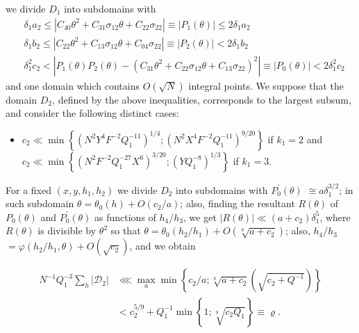 \documentclass[10pt]{article}
\begin{document}
\begin{itemize}
$$$$
we divide $D_{1}$ into subdomains with
$$
\begin{aligned}
& \delta_{1} a_{2} \leqslant\left|C_{40} \theta^{2}+C_{31} \sigma_{12} \theta+C_{22} \sigma_{22}\right| \equiv\left|P_{1}(\theta)\right| \leqslant 2 \delta_{1} a_{2} \\
& \delta_{1} b_{2} \leqslant\left|C_{22} \theta^{2}+C_{13} \sigma_{12} \theta+C_{04} \sigma_{22}\right| \equiv\left|P_{2}(\theta)\right|<2 \delta_{1} b_{2} \\
& \delta_{1}^{2} c_{2}<\left|P_{1}(\theta) P_{2}(\theta)-\left(C_{31} \theta^{2}+C_{22} \sigma_{12} \theta+C_{13} \sigma_{22}\right)^{2}\right| \equiv\left|P_{0}(\theta)\right|<2 \delta_{1}^{2} c_{2}
\end{aligned}
$$
and one domain which contains $O(\sqrt{N})$ integral points. We suppose that the domain $D_{2}$, defined by the above inequalities, corresponds to the largest subsum, and consider the following distinct cases:
\end{itemize}

\begin{itemize}
  \item[A.] $c_{2} \ll \min \left\{\left(N^{2} Y^{4} F^{-2} Q_{1}^{-11}\right)^{1 / 4} ;\left(N^{2} X^{4} F^{-2} Q_{1}^{-11}\right)^{9 / 20}\right\}$ if $k_{1}=2$ and $c_{2} \ll \min \left\{\left(N^{2} F^{-2} Q_{1}^{-27} X^{6}\right)^{3 / 20} ;\left(Y Q_{1}^{-8}\right)^{1 / 3}\right\}$ if $k_{1}=3$.
\end{itemize}

For a fixed $\left(x, y, h_{1}, h_{2}\right)$ we divide $D_{2}$ into subdomains with $P_{0}^{\prime}(\theta)$ $\cong a \delta_{1}^{3 / 2}$; in such subdomain $\theta=\theta_{0}(h)+O\left(c_{2} / a\right)$; also, finding the resultant $R(\theta)$ of $P_{0}(\theta)$ and $P_{0}^{\prime}(\theta)$ as functions of $h_{4} / h_{3}$, we get $|R(\theta)| \ll\left(a+c_{2}\right) \delta_{1}^{5}$, where $R(\theta)$ is divisible by $\theta^{2}$ so that $\theta=\theta_{0}\left(h_{2} / h_{1}\right)+O\left(\sqrt[8]{a+c_{2}}\right)$; also, $h_{4} / h_{3}$ $=\varphi\left(h_{2} / h_{1}, \theta\right)+O\left(\sqrt{c_{2}}\right)$, and we obtain

$$
\begin{aligned}
N^{-1} Q_{1}^{-3} \sum_{h}\left|\mathscr{D}_{2}\right| & \lll \max _{a} \min \left\{c_{2} / a ; \sqrt[8]{a+c_{2}}\left(\sqrt{c_{2}+Q^{-1}}\right)\right\} \\
& <c_{2}^{5 / 9}+Q_{1}^{-1} \min \left\{1 ; \sqrt[9]{c_{2} Q_{1}}\right\} \equiv \varrho .
\end{aligned}
$$
\end{document}
